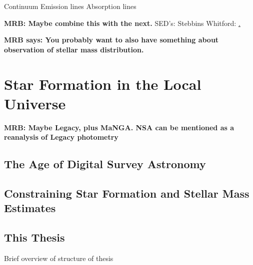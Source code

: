 Continuum
Emission lines
Absorption lines

{\bf MRB: Maybe combine this with the next.}
SED's: Stebbins Whitford: \href{http://adsabs.harvard.edu/abs/1968ApJ...154...21O}.



{\bf MRB says: You probably want to also have something
about observation of stellar mass distribution.}

\section{Star Formation in the Local Universe}

{\bf MRB: Maybe Legacy, plus MaNGA. NSA can be mentioned
as a reanalysis of Legacy photometry}

\subsection{The Age of Digital Survey Astronomy}

\subsection{Constraining Star Formation and Stellar Mass Estimates}

\subsection{This Thesis}
Brief overview of structure of thesis




